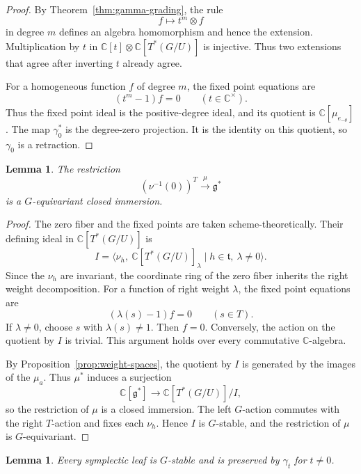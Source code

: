 \documentclass[12pt]{article}
\theoremstyle{paperplain}
\newtheorem{lemma}[theorem]{Lemma}
\theoremstyle{paperdefinition}
\newcommand{\C}{\mathbb C}
\newcommand{\g}{\mathfrak g}
\newcommand{\tfrak}{\mathfrak t}
\begin{document}
\begin{proof}
    By Theorem~\ref{thm:gamma-grading}, the rule
    $$
        f\longmapsto t^m\otimes f
    $$
    in degree $m$ defines an algebra homomorphism and hence the extension. Multiplication by $t$ in $\C[t]\otimes\C[T^*(G/U)]$ is injective. Thus two extensions that agree after inverting $t$ already agree.

    For a homogeneous function $f$ of degree $m$, the fixed point equations are
    $$
        (t^m-1)f=0\qquad(t\in\C^\times).
    $$
    Thus the fixed point ideal is the positive-degree ideal, and its quotient is $\C[\mu_{e_{-\theta}}]$. The map $\gamma_0^*$ is the degree-zero projection. It is the identity on this quotient, so $\gamma_0$ is a retraction.
\end{proof}

\begin{lemma}\label{lem:fixed-scheme-immersion}
    The restriction
    $$
        (\nu^{-1}(0))^T\overset{\mu}{\longrightarrow}\g^*
    $$
    is a $G$-equivariant closed immersion.
\end{lemma}

\begin{proof}
    The zero fiber and the fixed points are taken scheme-theoretically. Their defining ideal in $\C[T^*(G/U)]$ is
    $$
        I=\bigl\langle\nu_h,\ \C[T^*(G/U)]_\lambda
        \mid h\in\tfrak,\ \lambda\ne0\bigr\rangle.
    $$
    Since the $\nu_h$ are invariant, the coordinate ring of the zero fiber inherits the right weight decomposition. For a function of right weight $\lambda$, the fixed point equations are
    $$
        (\lambda(s)-1)f=0\qquad(s\in T).
    $$
    If $\lambda\ne0$, choose $s$ with $\lambda(s)\ne1$. Then $f=0$. Conversely, the action on the quotient by $I$ is trivial. This argument holds over every commutative $\C$-algebra.

    By Proposition~\ref{prop:weight-spaces}, the quotient by $I$ is generated by the images of the $\mu_a$. Thus $\mu^*$ induces a surjection
    $$
        \C[\g^*]\longrightarrow\C[T^*(G/U)]/I,
    $$
    so the restriction of $\mu$ is a closed immersion. The left $G$-action commutes with the right $T$-action and fixes each $\nu_h$. Hence $I$ is $G$-stable, and the restriction of $\mu$ is $G$-equivariant.
\end{proof}

\setlength{\abovedisplayskip}{7pt plus 2pt minus 2pt}
\setlength{\belowdisplayskip}{7pt plus 2pt minus 2pt}
\setlength{\abovedisplayshortskip}{0pt plus 2pt}
\setlength{\belowdisplayshortskip}{5pt plus 2pt minus 2pt}
\begin{lemma}\label{lem:implosion-leaves}
    Every symplectic leaf is $G$-stable and is preserved by $\gamma_t$ for $t\ne0$.
\end{lemma}
\end{document}
